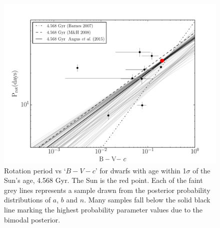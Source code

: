 \begin{figure}
\begin{center}
\includegraphics[width=6in, clip=true, trim=0 0 0.5in 0]{figures/p_vs_bv_solar.pdf}
\caption[A new gyrochronology relation: period vs colour.]
{Rotation period vs `$B-V-c$' for dwarfs with age within 1$\sigma$ of
	the Sun's age, 4.568 Gyr.
	The Sun is the red point.
	Each of the faint grey lines represents a
	sample drawn from the posterior probability distributions of $a$, $b$ and $n$.
	Many samples fall below the solid black line marking the highest
	probability parameter values due to the bimodal posterior.
\label{fig:p_vs_bv_solar}}
\end{center}
\end{figure}

